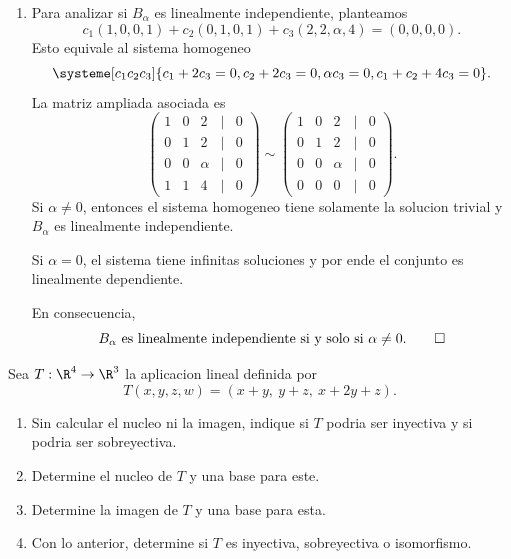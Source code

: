 \documentclass[11pt,respuestas,a4]{aleph-examen}
\begin{document}
\begin{preguntas}
\begin{respuesta}\hspace{0pt}
\begin{enumerate}
\item
    Para analizar si $B_\alpha$ es linealmente independiente, planteamos
    \[
        c_1(1,0,0,1)+c_2(0,1,0,1)+c_3(2,2,\alpha,4)=(0,0,0,0).
    \]
    Esto equivale al sistema homogeneo
    \[
        \systeme[c_1c_2c_3]{
            c_1+2c_3=0,
            c_2+2c_3=0,
            \alpha c_3=0,
            c_1+c_2+4c_3=0
        }.
    \]
    La matriz ampliada asociada es
    \[
        \begin{pmatrix}
            1 & 0 & 2 & | & 0\\
            0 & 1 & 2 & | & 0\\
            0 & 0 & \alpha & | & 0\\
            1 & 1 & 4 & | & 0
        \end{pmatrix}
        \sim
        \begin{pmatrix}
            1 & 0 & 2 & | & 0\\
            0 & 1 & 2 & | & 0\\
            0 & 0 & \alpha & | & 0\\
            0 & 0 & 0 & | & 0
        \end{pmatrix}.
    \]
    Si $\alpha\neq 0$, entonces el sistema homogeneo tiene solamente la solucion trivial y $B_\alpha$ es linealmente independiente.

    Si $\alpha=0$, el sistema tiene infinitas soluciones y por ende el conjunto es linealmente dependiente.

    En consecuencia,
    \[
        B_\alpha \text{ es linealmente independiente si y solo si } \alpha\neq 0.
        \qedhere
    \]
\end{enumerate}
\end{respuesta}

\item
    Sea $T:\R^4\to\R^3$ la aplicacion lineal definida por
    \[
        T(x,y,z,w)=(x+y,\ y+z,\ x+2y+z).
    \]
    \begin{enumerate}
    \item
        Sin calcular el nucleo ni la imagen, indique si $T$ podria ser inyectiva y si podria ser sobreyectiva.
    \item
        Determine el nucleo de $T$ y una base para este.
    \item
        Determine la imagen de $T$ y una base para esta.
    \item
        Con lo anterior, determine si $T$ es inyectiva, sobreyectiva o isomorfismo.
    \end{enumerate}


\end{preguntas}
\end{document}
